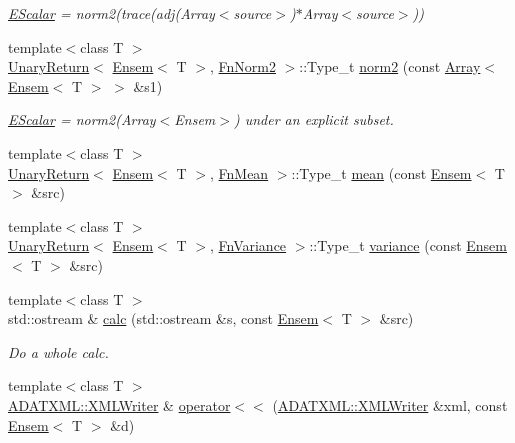 \begin{DoxyCompactItemize}
\begin{DoxyCompactList}\small\item\em \mbox{\hyperlink{classENSEM_1_1EScalar}{E\+Scalar}} = norm2(trace(adj(\+Array$<$source$>$)$\ast$\+Array$<$source$>$)) \end{DoxyCompactList}\item 
{\footnotesize template$<$class T $>$ }\\\mbox{\hyperlink{structENSEM_1_1UnaryReturn}{Unary\+Return}}$<$ \mbox{\hyperlink{classENSEM_1_1Ensem}{Ensem}}$<$ T $>$, \mbox{\hyperlink{structENSEM_1_1FnNorm2}{Fn\+Norm2}} $>$\+::Type\+\_\+t \mbox{\hyperlink{namespaceENSEM_a67904e4929712a1fa81e70ed7980c05b}{norm2}} (const \mbox{\hyperlink{classXMLArray_1_1Array}{Array}}$<$ \mbox{\hyperlink{classENSEM_1_1Ensem}{Ensem}}$<$ T $>$ $>$ \&s1)
\begin{DoxyCompactList}\small\item\em \mbox{\hyperlink{classENSEM_1_1EScalar}{E\+Scalar}} = norm2(\+Array$<$\+Ensem$>$) under an explicit subset. \end{DoxyCompactList}\item 
{\footnotesize template$<$class T $>$ }\\\mbox{\hyperlink{structENSEM_1_1UnaryReturn}{Unary\+Return}}$<$ \mbox{\hyperlink{classENSEM_1_1Ensem}{Ensem}}$<$ T $>$, \mbox{\hyperlink{structENSEM_1_1FnMean}{Fn\+Mean}} $>$\+::Type\+\_\+t \mbox{\hyperlink{namespaceENSEM_a57df5bdf8770d89f824a3898e08c2d81}{mean}} (const \mbox{\hyperlink{classENSEM_1_1Ensem}{Ensem}}$<$ T $>$ \&src)
\item 
{\footnotesize template$<$class T $>$ }\\\mbox{\hyperlink{structENSEM_1_1UnaryReturn}{Unary\+Return}}$<$ \mbox{\hyperlink{classENSEM_1_1Ensem}{Ensem}}$<$ T $>$, \mbox{\hyperlink{structENSEM_1_1FnVariance}{Fn\+Variance}} $>$\+::Type\+\_\+t \mbox{\hyperlink{namespaceENSEM_a0745a1a4b4007ac858d64767bed5f6d4}{variance}} (const \mbox{\hyperlink{classENSEM_1_1Ensem}{Ensem}}$<$ T $>$ \&src)
\item 
{\footnotesize template$<$class T $>$ }\\std\+::ostream \& \mbox{\hyperlink{namespaceENSEM_a6bddab1f5c5944deb2e2e9340fa6df10}{calc}} (std\+::ostream \&s, const \mbox{\hyperlink{classENSEM_1_1Ensem}{Ensem}}$<$ T $>$ \&src)
\begin{DoxyCompactList}\small\item\em Do a whole calc. \end{DoxyCompactList}\item 
{\footnotesize template$<$class T $>$ }\\\mbox{\hyperlink{classADATXML_1_1XMLWriter}{A\+D\+A\+T\+X\+M\+L\+::\+X\+M\+L\+Writer}} \& \mbox{\hyperlink{namespaceENSEM_a88d3bf4c2ceeffc73f878f8236fc624e}{operator$<$$<$}} (\mbox{\hyperlink{classADATXML_1_1XMLWriter}{A\+D\+A\+T\+X\+M\+L\+::\+X\+M\+L\+Writer}} \&xml, const \mbox{\hyperlink{classENSEM_1_1Ensem}{Ensem}}$<$ T $>$ \&d)

\end{DoxyCompactItemize}
